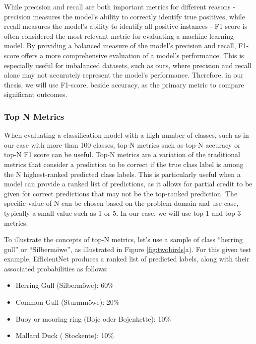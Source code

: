 While precision and recall are both important metrics for different reasons - precision measures the model's ability to correctly identify true positives, while recall measures the model's ability to identify all positive instances -  F1 score is often considered the most relevant metric for evaluating a machine learning model. By providing a balanced measure of the model's precision and recall,  F1-score offers a more comprehensive evaluation of a model's performance. This is especially useful for imbalanced datasets, such as ours, where precision and recall alone may not accurately represent the model's performance. Therefore, in our thesis, we will use F1-score, beside accuracy, as the primary metric to compare significant outcomes.

\subsubsection{Top N Metrics}

When evaluating a classification model with a high number of classes, such as in our case with more than 100 classes, top-N metrics such as top-N accuracy or top-N F1 score can be useful. Top-N metrics are a variation of the traditional metrics that consider a prediction to be correct if the true class label is among the N highest-ranked predicted class labels. This is particularly useful when a model can provide a ranked list of predictions, as it allows for partial credit to be given for correct predictions that may not be the top-ranked prediction. The specific value of N can be chosen based on the problem domain and use case, typically a small value such as 1 or 5. In our case, we will use top-1 and top-3 metrics.

To illustrate the concepts of top-N metrics, let's use a sample of class ``herring gull''  or ``Silbermöwe'', as illustrated in Figure \ref{fig:twobirds}a).  For this given test example, EfficientNet produces a ranked list of predicted labels, along with their associated probabilities as follows: 

\begin{itemize}
    \item Herring Gull (Silbermöwe): 60\%
    \item Common Gull (Sturmmöwe): 20\%
    \item Buoy  or mooring ring (Boje oder Bojenkette): 10\%
    \item Mallard Duck ( Stockente): 10\%
\end{itemize}

